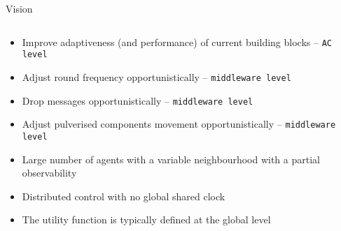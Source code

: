 \begin{frame}{\playfairblack Vision}
  \begin{columns}[onlytextwidth, t]
    \begin{column}{\textwidth}
      \begin{card}
        \begin{itemize}
          \item[\highlightAlt{\faStar}] Improve adaptiveness (and performance) of current building blocks -- \texttt{AC level}
          \item[\highlightAlt{\faStar}] Adjust round frequency opportunistically -- \texttt{middleware level}
          \item[\highlightAlt{\faStar}] Drop messages opportunistically -- \texttt{middleware level}
          \item[\highlightAlt{\faStar}] Adjust pulverised components movement opportunistically -- \texttt{middleware level}
        \end{itemize}
      \end{card}
      \begin{card}[Settings]
        \begin{itemize}
          \item Large number of agents with a variable neighbourhood with a partial observability
          \item Distributed control with no global shared clock 
          \item The utility function is typically defined at the global level
        \end{itemize}
      \end{card}
    \end{column}
  \end{columns}
\end{frame}